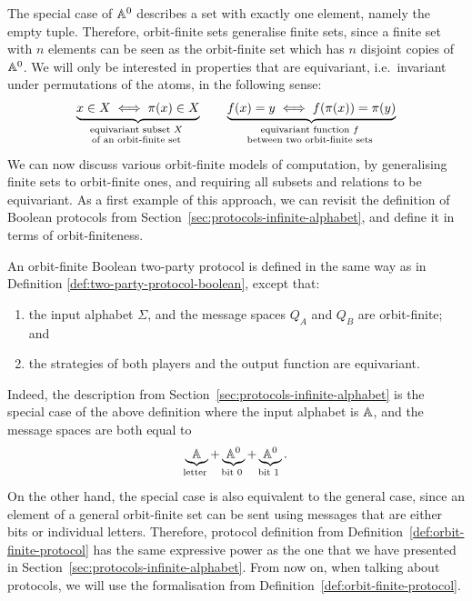 The special case of $\mathbb A^0$ describes a set with exactly one element, namely the empty tuple. Therefore, orbit-finite sets generalise finite sets, since a  finite set with $n$ elements can be seen as the orbit-finite set which has $n$ disjoint copies of $\mathbb A^0$. We will only be interested in properties that are equivariant, i.e.~invariant under permutations of the atoms, in the following sense:
\begin{align*}
\myunderbrace{x \in X \iff \pi(x) \in X}{equivariant subset $X$ \\ of an orbit-finite set}
\qquad 
\myunderbrace{f(x) = y \iff f(\pi(x)) = \pi(y)}{equivariant function $f$ \\ between two orbit-finite sets}
\end{align*}
We can now discuss various orbit-finite models of computation, by generalising finite sets to orbit-finite ones, and requiring all subsets and relations to be equivariant. As a first example of this approach, we can revisit the definition of Boolean protocols from Section~\ref{sec:protocols-infinite-alphabet}, and define it in terms of orbit-finiteness.

\begin{definition}
    \label{def:orbit-finite-protocol}
  An orbit-finite Boolean two-party protocol  is defined in the same way as in Definition \ref{def:two-party-protocol-boolean}, except that:
  \begin{enumerate}
    \item the input alphabet $\Sigma$, and the message spaces $Q_A$ and $Q_B$ are orbit-finite; and 
    \item the strategies of both players and the output function are equivariant.
  \end{enumerate}
\end{definition}

Indeed, the description from Section~\ref{sec:protocols-infinite-alphabet} is  the special case of the above definition where the input alphabet is $\mathbb A$, and the message spaces are both equal to 
\begin{align*}
\myunderbrace{\atoms}{letter} + \myunderbrace{\atoms^0}{bit 0} + \myunderbrace{\atoms^0}{bit 1}.
\end{align*}
On the other hand, the special case is also equivalent to the general case, since an element of a general orbit-finite set can be sent using messages that are either bits or individual letters. Therefore, protocol definition from Definition~\ref{def:orbit-finite-protocol} has the same expressive power as the one that we have presented in Section~\ref{sec:protocols-infinite-alphabet}. From now on, when talking about protocols, we will use the formalisation from Definition~\ref{def:orbit-finite-protocol}.

